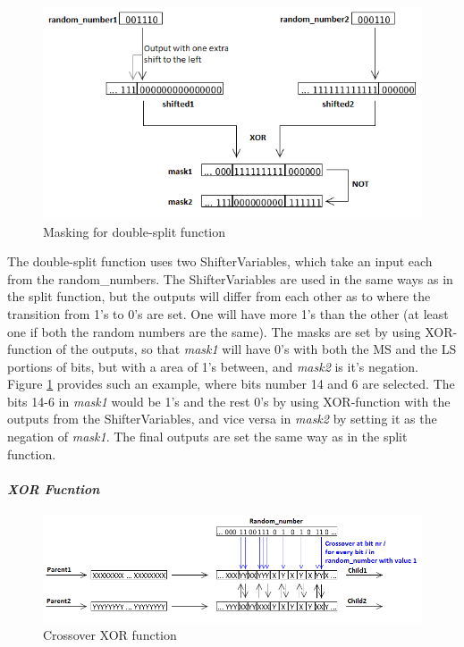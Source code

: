 \begin{figure}[H]
\includegraphics[width=\textwidth]{fpga/fig/crossover_doublesplit_mask.png}
\caption{Masking for double-split function}
\label{fig_crossover_doublesplit_mask}
\end{figure}

The double-split function uses two ShifterVariables, which take an input each from the random\_numbers.
The ShifterVariables are used in the same ways as in the split function, but the outputs will differ from each other as to where the transition from 1's to 0's are set.
One will have more 1's than the other (at least one if both the random numbers are the same).
The masks are set by using XOR-function of the outputs, so that \emph{mask1} will have 0's with both the MS and the LS portions of bits, but with a area of 1's between, and \emph{mask2} is it's negation.
Figure \ref{fig_crossover_doublesplit_mask} provides such an example, where bits number 14 and 6 are selected.
The bits 14-6 in \emph{mask1} would be 1's and the rest 0's by using XOR-function with the outputs from the ShifterVariables, and vice versa in \emph{mask2} by setting it as the negation of \emph{mask1}.
The final outputs are set the same way as in the split function.


\paragraph{\textit{XOR Fucntion}}
\begin{figure}[H]
\includegraphics[width=\textwidth]{fpga/fig/crossover_xor.png}
\caption{Crossover XOR function}
\label{fig_crossover_xor}
\end{figure}

